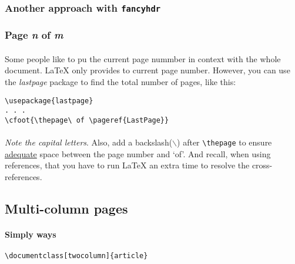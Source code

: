 \subsubsection{Another approach with \texttt{fancyhdr}}
\subsubsection{Page \emph{n} of \emph{m}}
\paragraph{}
Some people like to pu the current page nummber in context with the whole document.
\LaTeX{} only provides to current page number. However, you can use the \emph{lastpage}
package to find the total number of pages, like this:
\begin{verbatim}
\usepackage{lastpage}
. . .
\cfoot{\thepage\ of \pageref{LastPage}}
\end{verbatim}

\paragraph{}
\emph{Note the capital letters}. Also, add a backslash(\texttt{$\backslash$}) after
\verb|\thepage| to ensure \underline{adequate} space between the page number and
`of'. And recall, when using references, that you have to run \LaTeX{} an extra time
to resolve the cross-references.

\subsection{Multi-column pages}
\paragraph{Simply ways}
\begin{verbatim}
\documentclass[twocolumn]{article}
\end{verbatim} 
